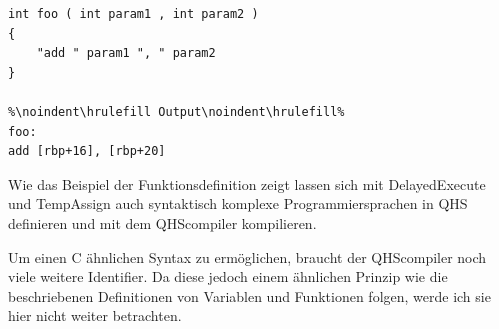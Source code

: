 \begin{lstlisting}[language=QHS, caption=Finale Definition einer Funktion in QHS]
int foo ( int param1 , int param2 )
{
    "add " param1 ", " param2
}

%\noindent\hrulefill Output\noindent\hrulefill%
foo:
add [rbp+16], [rbp+20]
\end{lstlisting}

Wie das Beispiel der Funktionsdefinition zeigt lassen sich mit DelayedExecute und TempAssign auch syntaktisch komplexe Programmiersprachen in QHS definieren und mit dem QHScompiler kompilieren.

Um einen C ähnlichen Syntax zu ermöglichen, braucht der QHScompiler noch viele weitere Identifier.
Da diese jedoch einem ähnlichen Prinzip wie die beschriebenen Definitionen von Variablen und Funktionen folgen, werde ich sie hier nicht weiter betrachten.


    






